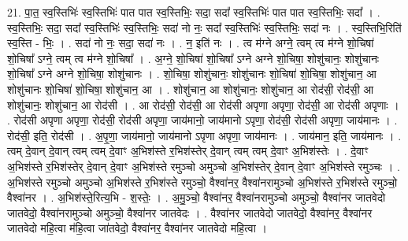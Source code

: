 \documentclass[17pt]{extarticle}
\begin{document}
21. पा॒त॒ स्व॒स्तिभिः॑ स्व॒स्तिभिः॑ पात पात स्व॒स्तिभिः॒ सदा॒ सदा᳚ स्व॒स्तिभिः॑ पात पात स्व॒स्तिभिः॒ सदा᳚ । . स्व॒स्तिभिः॒ सदा॒ सदा᳚ स्व॒स्तिभिः॑ स्व॒स्तिभिः॒ सदा॑ नो नः॒ सदा᳚ स्व॒स्तिभिः॑ स्व॒स्तिभिः॒ सदा॑ नः । . स्व॒स्तिभि॒रिति॑ स्व॒स्ति - भिः॒ । . सदा॑ नो नः॒ सदा॒ सदा॑ नः । . न॒ इति॑ नः । . त्व म॑ग्ने अग्ने॒ त्वम् त्व म॑ग्ने शो॒चिषा॑ शो॒चिषा᳚ ऽग्ने॒ त्वम् त्व म॑ग्ने शो॒चिषा᳚ । . अ॒ग्ने॒ शो॒चिषा॑ शो॒चिषा᳚ ऽग्ने अग्ने शो॒चिषा॒ शोशु॑चानः॒ शोशु॑चानः शो॒चिषा᳚ ऽग्ने अग्ने शो॒चिषा॒ शोशु॑चानः । . शो॒चिषा॒ शोशु॑चानः॒ शोशु॑चानः शो॒चिषा॑ शो॒चिषा॒ शोशु॑चान॒ आ शोशु॑चानः शो॒चिषा॑ शो॒चिषा॒ शोशु॑चान॒ आ । . शोशु॑चान॒ आ शोशु॑चानः॒ शोशु॑चान॒ आ रोद॑सी॒ रोद॑सी॒ आ शोशु॑चानः॒ शोशु॑चान॒ आ रोद॑सी । . आ रोद॑सी॒ रोद॑सी॒ आ रोद॑सी अपृणा अपृणा॒ रोद॑सी॒ आ रोद॑सी अपृणाः । . रोद॑सी अपृणा अपृणा॒ रोद॑सी॒ रोद॑सी अपृणा॒ जाय॑मानो॒ जाय॑मानो ऽपृणा॒ रोद॑सी॒ रोद॑सी अपृणा॒ जाय॑मानः । . रोद॑सी॒ इति॒ रोद॑सी । . अ॒पृ॒णा॒ जाय॑मानो॒ जाय॑मानो ऽपृणा अपृणा॒ जाय॑मानः । . जाय॑मान॒ इति॒ जाय॑मानः । . त्वम् दे॒वान् दे॒वान् त्वम् त्वम् दे॒वाꣳ अ॒भिश॑स्ते र॒भिश॑स्तेर् दे॒वान् त्वम् त्वम् दे॒वाꣳ अ॒भिश॑स्तेः । . दे॒वाꣳ अ॒भिश॑स्ते र॒भिश॑स्तेर् दे॒वान् दे॒वाꣳ अ॒भिश॑स्ते रमुञ्चो अमुञ्चो अ॒भिश॑स्तेर् दे॒वान् दे॒वाꣳ अ॒भिश॑स्ते रमुञ्चः । . अ॒भिश॑स्ते रमुञ्चो अमुञ्चो अ॒भिश॑स्ते र॒भिश॑स्ते रमुञ्चो॒ वैश्वा॑नर॒ वैश्वा॑नरामुञ्चो अ॒भिश॑स्ते र॒भिश॑स्ते रमुञ्चो॒ वैश्वा॑नर । . अ॒भिश॑स्ते॒रित्य॒भि - श॒स्तेः॒ । . अ॒मु॒ञ्चो॒ वैश्वा॑नर॒ वैश्वा॑नरामुञ्चो अमुञ्चो॒ वैश्वा॑नर जातवेदो जातवेदो॒ वैश्वा॑नरामुञ्चो अमुञ्चो॒ वैश्वा॑नर जातवेदः । . वैश्वा॑नर जातवेदो जातवेदो॒ वैश्वा॑नर॒ वैश्वा॑नर जातवेदो महि॒त्वा म॑हि॒त्वा जा॑तवेदो॒ वैश्वा॑नर॒ वैश्वा॑नर जातवेदो महि॒त्वा । \newline
\end{document}
